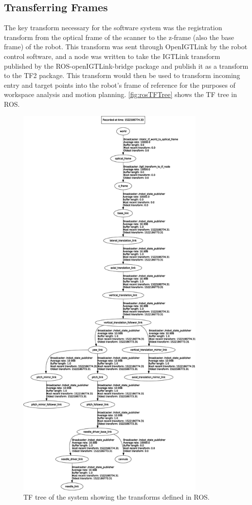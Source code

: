 \documentclass[12pt]{report}
\begin{document}
\subsection{Transferring Frames}
The key transform necessary for the software system was the registration transform from the optical frame of the scanner to the z-frame (also the base frame) of the robot. This transform was sent through OpenIGTLink by the robot control software, and a node was written to take the IGTLink transform published by the ROS-openIGTLink-bridge package and publish it as a transform to the TF2 package. This transform would then be used to transform incoming entry and target points into the robot's frame of reference for the purposes of workspace analysis and motion planning. \autoref{fig:rosTFTree} shows the TF tree in ROS.

\begin{figure}[thpb]
	\centering
	\includegraphics[height=8in]{diagrams/neuro_tf_frames_clipped.pdf}
    \caption{TF tree of the system showing the transforms defined in ROS. }
    \label{fig:rosTFTree}
\end{figure}
\end{document}
